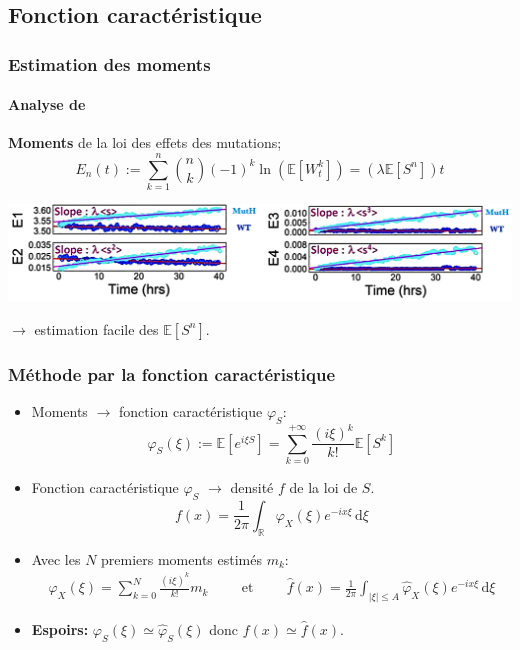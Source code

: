 \documentclass{beamer}
\newcommand{\pth}[1]{\left(#1\right)}
\newcommand{\cro}[1]{\left[#1\right]}
\newcommand{\abs}[1]{\left|#1\right|}
\newcommand{\et}{\hspace{1cm}\text{et}\hspace{1cm}}
\newcommand{\de}{\,\text{d}}
\newcommand{\Esp}[1]{\mathbb{E}\cro{#1}}
\begin{document}
\begin{frame}
  \sectionpage
\end{frame}

\subsection{Fonction caractéristique}

\begin{frame}
  \frametitle{Estimation des moments}

  \framesubtitle{Analyse de \cite{rob}}

  
\textbf{Moments} de la loi des effets des mutations;
 \[E_n(t):=\sum_{k=1}^n\binom{n}{k}(-1)^k\ln\pth{\Esp{W_t^k}}=\pth{\lambda\Esp{S^n}}t\]
 \pause
    \vspace{0.7cm}
 \begin{centering}
 
    \includegraphics[scale=0.55]{img/Moments_estimation.png}
 \end{centering}
    \vspace{0.7cm}
 
$\to$ estimation facile des $\Esp{S^n}$.
\end{frame}


\begin{frame}
  \frametitle{Méthode par la fonction caractéristique}
  
  \begin{itemize}[label=$\bullet$]
  \item Moments $\to$ fonction caractéristique $\varphi_S$: 
    \[\varphi_S(\xi):=\Esp{e^{i\xi S}}=\sum_{k=0}^{+\infty}\frac{(i\xi)^k}{k!}\Esp{S^k}\]
    \pause
  \item Fonction caractéristique $\varphi_S$ $\to$ densité $f$ de la loi de $S$.
    \[f(x) = \frac1{2\pi} \int_{\mathbb R}\varphi_X(\xi)e^{-ix\xi}\de\xi\]
    \pause
  \item Avec les $N$ premiers moments estimés $m_k$:
    \begin{align*}
      \hat{\varphi}_X(\xi)=\sum_{k=0}^{N}\frac{(i\xi)^k}{k!}m_k
      \et\hat{f}(x)= \frac1{2\pi} \int_{\abs{\xi}\leqslant A}\hat\varphi_X(\xi)e^{-ix\xi}\de\xi
    \end{align*}
    \pause
    \vspace{0.3cm}
    
  \item  \textbf{Espoirs:} $\varphi_S(\xi)\simeq \hat{\varphi}_S(\xi)$ donc $f(x)\simeq\hat{f}(x)$.
  \end{itemize}
  
\end{frame}
\end{document}
